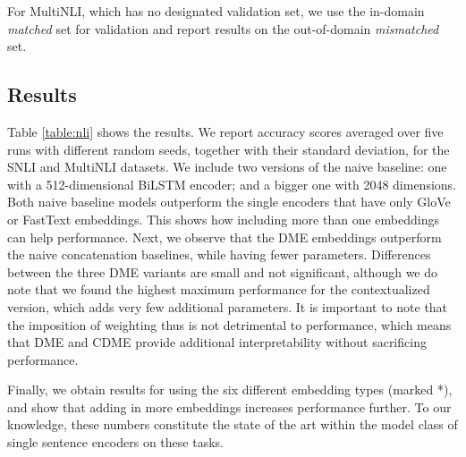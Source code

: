 \documentclass[11pt,a4paper]{article}
\begin{document}
For MultiNLI, which has no designated validation set, we use the in-domain \emph{matched} set for validation and report results on the out-of-domain \emph{mismatched} set.

\subsection{Results}

Table \ref{table:nli} shows the results. We report accuracy scores averaged over five runs with different random seeds, together with their standard deviation, for the SNLI and MultiNLI datasets. We include two versions of the naive baseline: one with a 512-dimensional BiLSTM encoder; and a bigger one with 2048 dimensions. Both naive baseline models outperform the single encoders that have only GloVe or FastText embeddings. This shows how including more than one embeddings can help performance. Next, we observe that the DME embeddings outperform the naive concatenation baselines, while having fewer parameters. Differences between the three DME variants are small and not significant, although we do note that we found the highest maximum performance for the contextualized version, which adds very few additional parameters. It is important to note that the imposition of weighting thus is not detrimental to performance, which means that DME and CDME provide additional interpretability without sacrificing performance.

Finally, we obtain results for using the six different embedding types (marked *), and show that adding in more embeddings increases performance further. To our knowledge, these numbers constitute the state of the art within the model class of single sentence encoders on these tasks.
\end{document}
